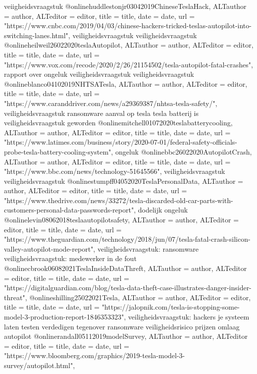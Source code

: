 {{{veiigheidsvraagstuk
@online{huddlestonjr03042019ChineseTeslaHack,	ALTauthor = {author},	ALTeditor = {editor},	title = {title},	date = {date},	url = {"https://www.cnbc.com/2019/04/03/chinese-hackers-tricked-teslas-autopilot-into-switching-lanes.html"},}
veiligheidsvraagstuk
veiligheidsvraagstuk
@online{heilweil26022020teslaAutopilot,	ALTauthor = {author},	ALTeditor = {editor},	title = {title},	date = {date},	url = {"https://www.vox.com/recode/2020/2/26/21154502/tesla-autopilot-fatal-crashes"},}
rapport over ongeluk
veiligheidsvraagstuk
veiligheidsvraagstuk
@online{blanco04102019NHTSATesla,	ALTauthor = {author},	ALTeditor = {editor},	title = {title},	date = {date},	url = {"https://www.caranddriver.com/news/a29369387/nhtsa-tesla-safety/"},}
veiligheidsvraagstuk
ransomware aanval op tesla
tesla batterij is veiligheidsvraagstuk geworden
@online{mitchell01072020teslabatterycooling,	ALTauthor = {author},	ALTeditor = {editor},	title = {title},	date = {date},	url = {"https://www.latimes.com/business/story/2020-07-01/federal-safety-officials-probe-tesla-battery-cooling-system"},}
ongeluk
@online{bbc26022020AutopilotCrash,	ALTauthor = {author},	ALTeditor = {editor},	title = {title},	date = {date},	url = {"https://www.bbc.com/news/technology-51645566"},}
veiligheidsvraagstuk
veiligheidsvraagstuk
@online{stumpff04052020TeslaPersonalData,	ALTauthor = {author},	ALTeditor = {editor},	title = {title},	date = {date},	url = {"https://www.thedrive.com/news/33272/tesla-discarded-old-car-parts-with-customers-personal-data-passwords-report"},}
dodelijk ongeluk
@online{levin08062018teslaautopilotsafety,	ALTauthor = {author},	ALTeditor = {editor},	title = {title},	date = {date},	url = {"https://www.theguardian.com/technology/2018/jun/07/tesla-fatal-crash-silicon-valley-autopilot-mode-report"},}
veiligheidsvraagstuk: ransomware
veiligheidsvraagstuk: medewerker in de fout
@online{cbrook06082021TeslaInsideDataThreft,	ALTauthor = {author},	ALTeditor = {editor},	title = {title},	date = {date},	url = {"https://digitalguardian.com/blog/tesla-data-theft-case-illustrates-danger-insider-threat"},}
@online{shilling25022021Tesla,	ALTauthor = {author},	ALTeditor = {editor},	title = {title},	date = {date},	url = {"https://jalopnik.com/tesla-is-stopping-some-model-3-production-report-1846353323"},}
veiligheidsvraagstuk: hackers je systeem laten testen
verdedigen tegenover ransomware
veiligheidsrisico
prijzen omlaag
autopilot
@online{randall05112019modelSurvey,	ALTauthor = {author},	ALTeditor = {editor},	title = {title},	date = {date},	url = {"https://www.bloomberg.com/graphics/2019-tesla-model-3-survey/autopilot.html"},}
}}}
